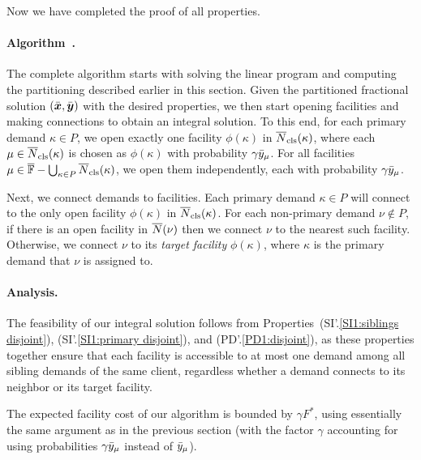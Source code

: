 Now we have completed the proof of all properties.

\paragraph{Algorithm~{\EBGS}.}
The complete algorithm starts with solving the linear program and
computing the partitioning described earlier in this section.
Given the partitioned fractional solution $(\bar{\boldsymbol{x}},
\bar{\boldsymbol{y}})$ with the desired properties, we then start opening
facilities and making connections to obtain an integral
solution. To this end, for each primary demand $\kappa\in P$,
we open exactly one facility $\phi(\kappa)$ in ${\overline{N}}_{\text{cls}}(\kappa)$,
where each $\mu\in{\overline{N}}_{\text{cls}}(\kappa)$ is chosen as $\phi(\kappa)$ with probability
$\gamma{\bar y}_{\mu}$. For all facilities
 $\mu\in\overline{\mathbb{F}} - \bigcup_{\kappa\in P}{\overline{N}}_{\text{cls}}(\kappa)$,
we open them independently, each with
probability $\gamma{\bar y}_{\mu}$. 

Next, we connect demands to facilities.
Each primary demand $\kappa\in P$ will connect
to the only open facility $\phi(\kappa)$ in ${\overline{N}}_{\text{cls}}(\kappa)$.  
For each non-primary demand $\nu\notin P$, if
there is an open facility in ${\overline{N}}(\nu)$ then we connect
$\nu$ to the nearest such facility. Otherwise, we connect
$\nu$ to its \emph{target facility} $\phi(\kappa)$, where $\kappa$ is the primary
demand that $\nu$ is assigned to. 


\paragraph{Analysis.}
The feasibility of our integral solution follows from
Properties~(SI'.\ref{SI1:siblings disjoint}), (SI'.\ref{SI1:primary
  disjoint}), and (PD'.\ref{PD1:disjoint}), as these properties together
ensure that each facility is accessible to at most one demand among
all sibling demands of the same client, regardless whether a demand
connects to its neighbor or its target facility.

The expected facility cost of our algorithm is bounded by
$\gamma F^\ast$, using essentially the same argument as in
the previous section (with the factor $\gamma$
accounting for using probabilities $\gamma {\bar y}_{\mu}$
instead of ${\bar y}_{\mu}$).

